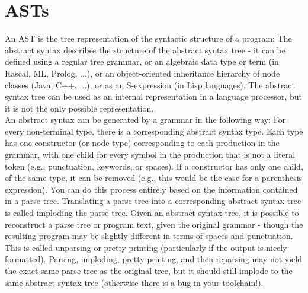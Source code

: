     \section{ASTs}
        An \gls{AST} is the tree representation of the syntactic structure of a program; The abstract syntax
        describes the structure of the abstract syntax tree - it can be defined using a
        regular tree grammar, or an algebraic data type or term (in Rascal, ML, Prolog,
        ...), or an object-oriented inheritance hierarchy of node classes (Java, C++, ...),
        or as an S-expression (in Lisp languages).
        The abstract syntax tree can be used as an internal representation in a language processor, 
        but it is not the only possible representation.\\
        An abstract syntax can be generated by a grammar in the following way:
        For every non-terminal type, there is a corresponding abstract syntax type.
        Each type has one constructor (or node type) corresponding to each production in the grammar, with one child for every symbol in the production that
        is not a literal token (e.g., punctuation, keywords, or spaces). If a constructor
        has only one child, of the same type, it can be removed (e.g., this would be
        the case for a parenthesis expression). You can do this process entirely based
        on the information contained in a parse tree. Translating a parse tree into a
        corresponding abstract syntax tree is called imploding the parse tree.
        Given an abstract syntax tree, it is possible to reconstruct a parse tree or program text, given the original grammar - though the resulting program may be
        slightly different in terms of spaces and punctuation. 
        This is called unparsing or pretty-printing (particularly if the output is nicely formatted). Parsing, imploding, pretty-printing, and then reparsing may not yield the exact same parse tree
        as the original tree, but it should still implode to the same abstract syntax tree (otherwise there is a bug in your toolchain!).

